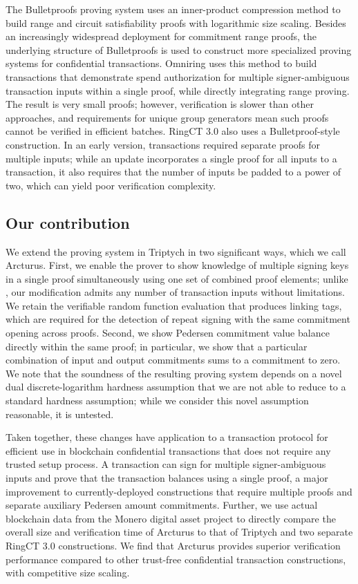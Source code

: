 \documentclass{article}
\theoremstyle{definition}
\begin{document}
The Bulletproofs \cite{bulletproofs} proving system uses an inner-product compression method to build range and circuit satisfiability proofs with logarithmic size scaling.
Besides an increasingly widespread deployment for commitment range proofs, the underlying structure of Bulletproofs is used to construct more specialized proving systems for confidential transactions.
Omniring \cite{omniring} uses this method to build transactions that demonstrate spend authorization for multiple signer-ambiguous transaction inputs within a single proof, while directly integrating range proving.
The result is very small proofs; however, verification is slower than other approaches, and requirements for unique group generators mean such proofs cannot be verified in efficient batches.
RingCT 3.0 \cite{rct3} also uses a Bulletproof-style construction.
In an early version, transactions required separate proofs for multiple inputs; while an update incorporates a single proof for all inputs to a transaction, it also requires that the number of inputs be padded to a power of two, which can yield poor verification complexity.


\subsection{Our contribution}
We extend the proving system in Triptych \cite{triptych} in two significant ways, which we call Arcturus.
First, we enable the prover to show knowledge of multiple signing keys in a single proof simultaneously using one set of combined proof elements; unlike \cite{rct3}, our modification admits any number of transaction inputs without limitations.
We retain the verifiable random function evaluation that produces linking tags, which are required for the detection of repeat signing with the same commitment opening across proofs.
Second, we show Pedersen commitment value balance directly within the same proof; in particular, we show that a particular combination of input and output commitments sums to a commitment to zero.
We note that the soundness of the resulting proving system depends on a novel dual discrete-logarithm hardness assumption that we are not able to reduce to a standard hardness assumption; while we consider this novel assumption reasonable, it is untested.

Taken together, these changes have application to a transaction protocol for efficient use in blockchain confidential transactions that does not require any trusted setup process.
A transaction can sign for multiple signer-ambiguous inputs and prove that the transaction balances using a single proof, a major improvement to currently-deployed constructions that require multiple proofs and separate auxiliary Pedersen amount commitments.
Further, we use actual blockchain data from the Monero digital asset project to directly compare the overall size and verification time of Arcturus to that of Triptych and two separate RingCT 3.0 constructions.
We find that Arcturus provides superior verification performance compared to other trust-free confidential transaction constructions, with competitive size scaling.
\end{document}

